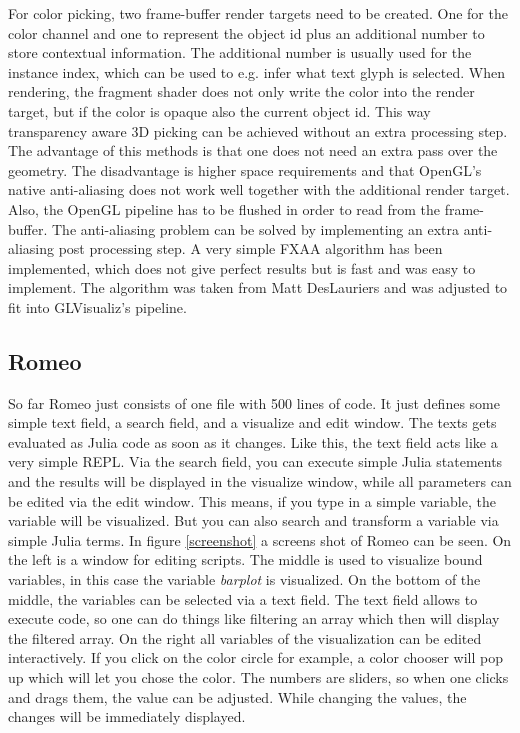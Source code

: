 For color picking, two frame-buffer render targets need to be created. 
One for the color channel and one to represent the object id plus an additional number to store contextual information. The additional number is usually used for the instance index, which can be used to e.g. infer what text glyph is selected.
When rendering, the fragment shader does not only write the color into the render target, but if the color is opaque also the current object id.
This way transparency aware 3D picking can be achieved without an extra processing step. 
The advantage of this methods is that one does not need an extra pass over the geometry. The disadvantage is higher space requirements and that OpenGL's native anti-aliasing does not work well together with the additional render target. Also, the OpenGL pipeline has to be flushed in order to read from the frame-buffer.
The anti-aliasing problem can be solved by implementing an extra anti-aliasing post processing step. A very simple FXAA algorithm has been implemented, which does not give perfect results but is fast and was easy to implement. The algorithm was taken from Matt DesLauriers\cite{FXAA} and was adjusted to fit into GLVisualiz's pipeline.


\subsection{Romeo}

So far Romeo just consists of one file with 500 lines of code. 
It just defines some simple text field, a search field, and a visualize and edit window.
The texts gets evaluated as Julia code as soon as it changes. Like this, the text field acts like a very simple \ac{REPL}.
Via the search field, you can execute simple Julia statements and the results will be displayed in the visualize window, while all parameters can be edited via the edit window.
This means, if you type in a simple variable, the variable will be visualized. But you can also search and transform a variable via simple Julia terms.
In figure \cref{screenshot} a screens shot of Romeo can be seen.
On the left is a window for editing scripts. The middle is used to visualize bound variables, in this case the variable \textit{barplot} is visualized.
On the bottom of the middle, the variables can be selected via a text field. The text field allows to execute code, so one can do things like filtering an array which then will display the filtered array.
On the right all variables of the visualization can be edited interactively.
If you click on the color circle for example, a color chooser will pop up which will let you chose the color.
The numbers are sliders, so when one clicks and drags them, the value can be adjusted. 
While changing the values, the changes will be immediately displayed.

